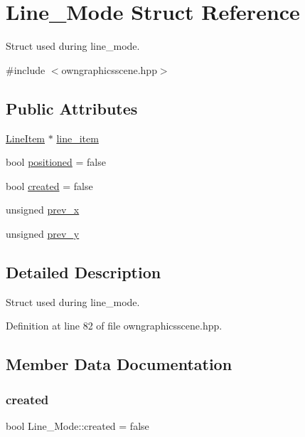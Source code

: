 \hypertarget{structLine__Mode}{}\section{Line\+\_\+\+Mode Struct Reference}
\label{structLine__Mode}


Struct used during line\+\_\+mode.  




{\ttfamily \#include $<$owngraphicsscene.\+hpp$>$}

\subsection*{Public Attributes}
\begin{DoxyCompactItemize}
\item 
\mbox{\hyperlink{classLineItem}{Line\+Item}} $\ast$ \mbox{\hyperlink{structLine__Mode_a4e11b31f28505579f3dfcde54b27ecac}{line\+\_\+item}}
\item 
bool \mbox{\hyperlink{structLine__Mode_aefbb8555f406d47d742491003a6afde1}{positioned}} = false
\item 
bool \mbox{\hyperlink{structLine__Mode_ae48257668288a2a284bef66727fa68e5}{created}} = false
\item 
unsigned \mbox{\hyperlink{structLine__Mode_a8bbcbaff29a7810e066e99174e562371}{prev\+\_\+x}}
\item 
unsigned \mbox{\hyperlink{structLine__Mode_a8d5fb940f686955ead3f368a8d3b9016}{prev\+\_\+y}}
\end{DoxyCompactItemize}


\subsection{Detailed Description}
Struct used during line\+\_\+mode. 

Definition at line 82 of file owngraphicsscene.\+hpp.



\subsection{Member Data Documentation}
\mbox{\label{structLine__Mode_ae48257668288a2a284bef66727fa68e5}} 
\subsubsection{\texorpdfstring{created}{created}}
{\footnotesize\ttfamily bool Line\+\_\+\+Mode\+::created = false}

